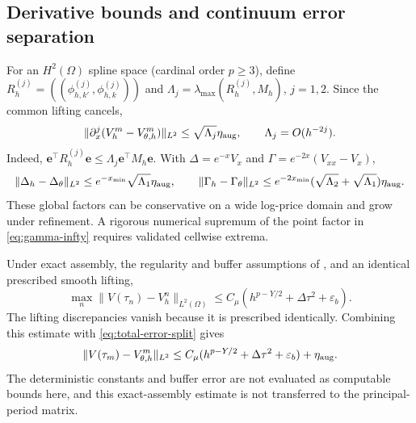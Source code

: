 \documentclass[11pt]{amsart}
\theoremstyle{remark}
\newcommand{\Mh}{M_h}
\newcommand{\dt}{\Delta\tau}
\newcommand{\ee}{\mathbf e}
\begin{document}
\subsection{Derivative bounds and continuum error separation}
\label{ssec:derivatives}\label{ssec:total-error}
For an $H^2(\Omega)$ spline space (cardinal order $p\ge3$), define
$R_h^{(j)}=((\phi_{h,k'}^{(j)},\phi_{h,k}^{(j)}))$ and
$\Lambda_j=\lambda_{\max}(R_h^{(j)},\Mh)$, $j=1,2$.
Since the common lifting cancels,
\[
 \|\partial_x^j(V_h^m-V_{\theta,h}^m)\|_{L^2}
 \le\sqrt{\Lambda_j}\eta_{\rm aug},
 \qquad \Lambda_j=O(h^{-2j}).
\]
Indeed, $\ee^\top R_h^{(j)}\ee\le\Lambda_j\ee^\top\Mh\ee$.
With $\Delta=e^{-x}V_x$ and $\Gamma=e^{-2x}(V_{xx}-V_x)$,
\[
 \|\Delta_h-\Delta_\theta\|_{L^2}
 \le e^{-x_{\min}}\sqrt{\Lambda_1}\eta_{\rm aug},\qquad
 \|\Gamma_h-\Gamma_\theta\|_{L^2}
 \le e^{-2x_{\min}}(\sqrt{\Lambda_2}+\sqrt{\Lambda_1})\eta_{\rm aug}.
\]
These global factors can be conservative on a wide log-price domain and
grow under refinement. A rigorous numerical supremum of the point factor
in \eqref{eq:gamma-infty} requires validated cellwise extrema.

Under exact assembly, the regularity and buffer assumptions of
\cite{DamircheliCGMY2026}, and an identical prescribed smooth lifting,
\begin{equation}
 \max_n\|V(\tau_n)-V_h^n\|_{L^2(\Omega)}
 \le C_\mu(h^{p-Y/2}+\dt^2+\varepsilon_b).
 \label{eq:deterministic-error}
\end{equation}
The lifting discrepancies vanish because it is prescribed identically.
Combining this estimate with \eqref{eq:total-error-split} gives
\[
 \|V(\tau_m)-V_{\theta,h}^m\|_{L^2}
 \le C_\mu(h^{p-Y/2}+\dt^2+\varepsilon_b)+\eta_{\rm aug}.
\]
The deterministic constants and buffer error are not evaluated as
computable bounds here, and this exact-assembly estimate is not transferred
to the principal-period matrix.
\end{document}
